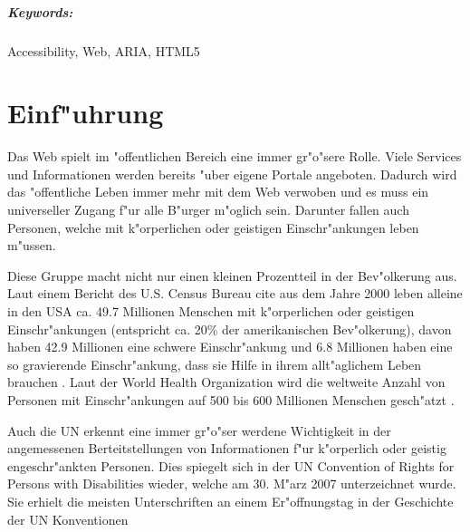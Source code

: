 \documentclass[a4paper,bibtotoc,oneside]{scrbook}
\begin{document}
\paragraph*{Keywords:} Accessibility, Web, ARIA, HTML5
\newpage


\tableofcontents\thispagestyle{empty}
\newpage

\setcounter{page}{1}

\chapter[Erstes Kapitel]{Einf"uhrung}
Das Web spielt im "offentlichen Bereich eine immer gr"o"sere Rolle. Viele
Services und Informationen werden bereits "uber eigene Portale angeboten.
Dadurch wird das "offentliche Leben immer mehr mit dem Web verwoben und es muss
ein universeller Zugang f"ur alle B"urger m"oglich sein. Darunter fallen auch
Personen, welche mit k"orperlichen oder geistigen Einschr"ankungen leben
m"ussen.

Diese Gruppe macht nicht nur einen kleinen Prozentteil in der Bev"olkerung aus.
Laut einem Bericht des U.S. Census Bureau cite aus dem Jahre 2000
leben alleine in den USA ca. 49.7 Millionen Menschen mit k"orperlichen oder
geistigen Einschr"ankungen (entspricht ca. 20\% der amerikanischen
Bev"olkerung), davon haben 42.9 Millionen eine schwere Einschr"ankung und 6.8
Millionen haben eine so gravierende Einschr"ankung, dass sie Hilfe in ihrem
allt"aglichem Leben brauchen \cite{us_cens}. Laut der World Health Organization
wird die weltweite Anzahl von Personen mit Einschr"ankungen auf
500 bis 600 Millionen Menschen gesch"atzt \cite{who_dis}.

Auch die UN erkennt eine immer gr"o"ser werdene Wichtigkeit in der angemessenen
Berteitstellungen von Informationen f"ur k"orperlich oder geistig
engeschr"ankten Personen. Dies spiegelt sich in der UN Convention of Rights
for Persons with Disabilities wieder, welche am 30. M"arz 2007 unterzeichnet
wurde. Sie erhielt die \glqq meisten Unterschriften an einem Er"offnungstag in
der Geschichte der UN Konventionen\grqq \cite{un_disabilities} 
\end{document}
